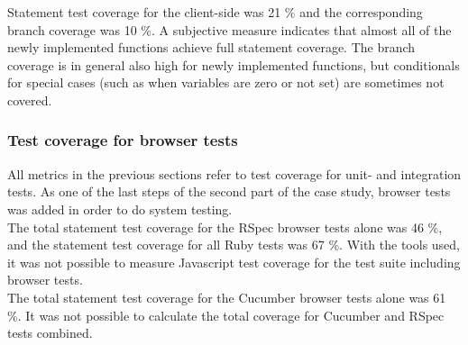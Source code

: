 Statement test coverage for the client-side was 21 \% and the
corresponding branch coverage was 10 \%. A subjective measure
indicates that almost all of the newly implemented functions achieve
full statement coverage. The branch coverage is in general also high for
newly implemented functions, but conditionals for special cases (such as
when variables are zero or not set) are sometimes not covered.\\

\subsubsection{Test coverage for browser tests}

All metrics in the previous sections refer to test coverage for unit-
and integration tests. As one of the last steps of the second part of
the case study, browser tests was added in order to do system
testing.\\

The total statement test coverage for the RSpec browser tests alone was
46 \%, and the statement test coverage for all Ruby tests was 67 \%.
With the tools used, it was not possible to measure Javascript test
coverage for the test suite including browser tests.\\

The total statement test coverage for the Cucumber browser tests alone
was 61 \%. It was not possible to calculate the total coverage for
Cucumber and RSpec tests combined.\\
